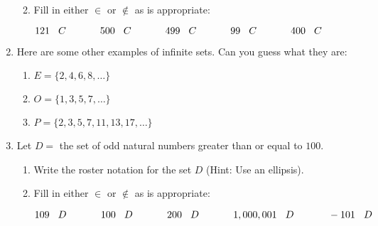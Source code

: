 \documentclass[letterpaper,12pt,fleqn]{article}
\begin{document}
\begin{enumerate}
\begin{enumerate}
    \vspace{1in}
    
  \item Fill in either $\in$ or $\notin$ as is appropriate:
    
    $121\hspace{2ex}C\hspace{8ex}500\hspace{2ex}C\hspace{8ex}499\hspace{2ex}C
    \hspace{8ex}99\hspace{2ex}C\hspace{8ex}400\hspace{2ex}C$
  \end{enumerate}

  \bigskip
  
\item Here are some other examples of infinite sets. Can you guess what they
  are:
  \begin{enumerate}
  \item $E=\{2,4,6,8,\ldots\}$

    \vspace{0.5in}
    
  \item $O=\{1,3,5,7,\ldots\}$

    \vspace{0.5in}
    
  \item $P=\{2,3,5,7,11,13,17,\ldots\}$

    \vspace{0.5in}
  \end{enumerate}

\item Let $D=$ the set of odd natural numbers greater than or equal to $100$.
  \begin{enumerate}
  \item Write the roster notation for the set $D$ (Hint: Use an ellipsis).

    \vspace{0.5in}
    
  \item Fill in either $\in$ or $\notin$ as is appropriate:
    
    $109\hspace{2ex}D\hspace{8ex}100\hspace{2ex}D\hspace{8ex}200\hspace{2ex}D
    \hspace{8ex}1,000,001\hspace{2ex}D\hspace{8ex}-101\hspace{2ex}D$
  \end{enumerate}

\end{enumerate}
\end{document}
